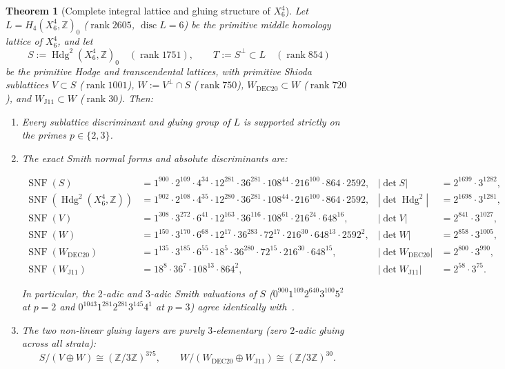 \documentclass[11pt,a4paper]{amsart}
\newtheorem{theorem}{Theorem}[section]
\theoremstyle{definition}
\newcommand{\ZZ}{\mathbb{Z}}
\newcommand{\Hdg}{\operatorname{Hdg}}
\newcommand{\SNF}{\operatorname{SNF}}
\newcommand{\rank}{\operatorname{rank}}
\newcommand{\disc}{\operatorname{disc}}
\begin{document}
\begin{theorem}[Complete integral lattice and gluing structure of $X_6^4$]\label{thm:B}
Let $L = H_4(X_6^4, \ZZ)_0$ ($\rank 2605$, $\disc L = 6$) be the primitive middle homology lattice of $X_6^4$, and let
\[
  S := \Hdg^2(X_6^4, \ZZ)_0 \quad (\rank 1751), \qquad T := S^\perp \subset L \quad (\rank 854)
\]
be the primitive Hodge and transcendental lattices, with primitive Shioda sublattices $V \subset S$ ($\rank 1001$), $W := V^\perp \cap S$ ($\rank 750$), $W_{\mathrm{DEC20}} \subset W$ ($\rank 720$), and $W_{\mathrm{J11}} \subset W$ ($\rank 30$). Then:
\begin{enumerate}
  \item Every sublattice discriminant and gluing group of $L$ is supported strictly on the primes $p \in \{2, 3\}$.
  \item The exact Smith normal forms and absolute discriminants are:
  \begin{footnotesize}
  \begin{align*}
    \SNF(S) &= 1^{900}\cdot 2^{109}\cdot 4^{34}\cdot 12^{281}\cdot 36^{281}\cdot 108^{44}\cdot 216^{100}\cdot 864\cdot 2592, & |\det S| &= 2^{1699}\cdot 3^{1282}, \\
    \SNF(\Hdg^2(X_6^4,\ZZ)) &= 1^{902}\cdot 2^{108}\cdot 4^{35}\cdot 12^{280}\cdot 36^{281}\cdot 108^{44}\cdot 216^{100}\cdot 864\cdot 2592, & |\det \Hdg^2| &= 2^{1698}\cdot 3^{1281}, \\
    \SNF(V) &= 1^{308}\cdot 3^{272}\cdot 6^{41}\cdot 12^{163}\cdot 36^{116}\cdot 108^{61}\cdot 216^{24}\cdot 648^{16}, & |\det V| &= 2^{841}\cdot 3^{1027}, \\
    \SNF(W) &= 1^{150}\cdot 3^{170}\cdot 6^{68}\cdot 12^{17}\cdot 36^{283}\cdot 72^{17}\cdot 216^{30}\cdot 648^{13}\cdot 2592^2, & |\det W| &= 2^{858}\cdot 3^{1005}, \\
    \SNF(W_{\mathrm{DEC20}}) &= 1^{135}\cdot 3^{185}\cdot 6^{55}\cdot 18^5\cdot 36^{280}\cdot 72^{15}\cdot 216^{30}\cdot 648^{15}, & |\det W_{\mathrm{DEC20}}| &= 2^{800}\cdot 3^{990}, \\
    \SNF(W_{\mathrm{J11}}) &= 18^8\cdot 36^7\cdot 108^{13}\cdot 864^2, & |\det W_{\mathrm{J11}}| &= 2^{58}\cdot 3^{75}.
  \end{align*}
  \end{footnotesize}
  In particular, the $2$-adic and $3$-adic Smith valuations of $S$ ($0^{900}1^{109}2^{640}3^{100}5^2$ at $p=2$ and $0^{1043}1^{281}2^{281}3^{145}4^1$ at $p=3$) agree identically with~\cite[Computation~2.2]{SdJ26}.
  \item The two non-linear gluing layers are purely $3$-elementary (zero $2$-adic gluing across all strata):
  \[
    S / (V \oplus W) \cong (\ZZ/3\ZZ)^{375}, \qquad W / (W_{\mathrm{DEC20}} \oplus W_{\mathrm{J11}}) \cong (\ZZ/3\ZZ)^{30}.
  \]
\end{enumerate}
\end{theorem}
\end{document}
